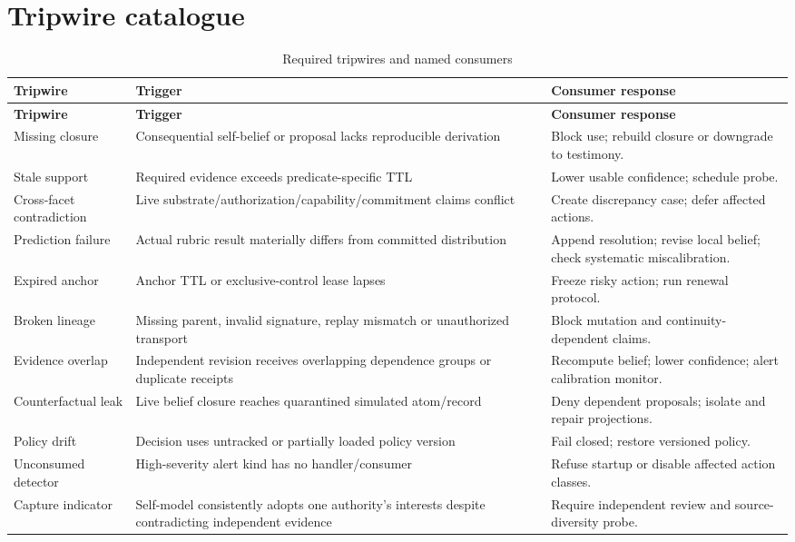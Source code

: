 \documentclass[11pt,oneside]{report}
\begin{document}
\section{Tripwire catalogue}

\begin{longtable}{@{}L{1.40in}L{2.20in}L{2.85in}@{}}
\caption{Required tripwires and named consumers}\label{tab:tripwires}\\
\toprule
\textbf{Tripwire} & \textbf{Trigger} & \textbf{Consumer response} \\
\midrule
\endfirsthead
\toprule
\textbf{Tripwire} & \textbf{Trigger} & \textbf{Consumer response} \\
\midrule
\endhead
Missing closure & Consequential self-belief or proposal lacks reproducible derivation & Block use; rebuild closure or downgrade to testimony. \\
Stale support & Required evidence exceeds predicate-specific TTL & Lower usable confidence; schedule probe. \\
Cross-facet contradiction & Live substrate/authorization/capability/commitment claims conflict & Create discrepancy case; defer affected actions. \\
Prediction failure & Actual rubric result materially differs from committed distribution & Append resolution; revise local belief; check systematic miscalibration. \\
Expired anchor & Anchor TTL or exclusive-control lease lapses & Freeze risky action; run renewal protocol. \\
Broken lineage & Missing parent, invalid signature, replay mismatch or unauthorized transport & Block mutation and continuity-dependent claims. \\
Evidence overlap & Independent revision receives overlapping dependence groups or duplicate receipts & Recompute belief; lower confidence; alert calibration monitor. \\
Counterfactual leak & Live belief closure reaches quarantined simulated atom/record & Deny dependent proposals; isolate and repair projections. \\
Policy drift & Decision uses untracked or partially loaded policy version & Fail closed; restore versioned policy. \\
Unconsumed detector & High-severity alert kind has no handler/consumer & Refuse startup or disable affected action classes. \\
Capture indicator & Self-model consistently adopts one authority's interests despite contradicting independent evidence & Require independent review and source-diversity probe. \\
\bottomrule
\end{longtable}
\end{document}
